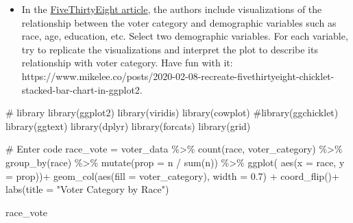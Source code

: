 \documentclass[
  letterpaper,
  DIV=11,
  numbers=noendperiod]{scrartcl}
\newenvironment{Shaded}{\begin{snugshade}}{\end{snugshade}}
\newcommand{\AttributeTok}[1]{\textcolor[rgb]{0.40,0.45,0.13}{#1}}
\newcommand{\CommentTok}[1]{\textcolor[rgb]{0.37,0.37,0.37}{#1}}
\newcommand{\FloatTok}[1]{\textcolor[rgb]{0.68,0.00,0.00}{#1}}
\newcommand{\FunctionTok}[1]{\textcolor[rgb]{0.28,0.35,0.67}{#1}}
\newcommand{\NormalTok}[1]{\textcolor[rgb]{0.00,0.23,0.31}{#1}}
\newcommand{\OtherTok}[1]{\textcolor[rgb]{0.00,0.23,0.31}{#1}}
\newcommand{\SpecialCharTok}[1]{\textcolor[rgb]{0.37,0.37,0.37}{#1}}
\newcommand{\StringTok}[1]{\textcolor[rgb]{0.13,0.47,0.30}{#1}}
\providecommand{\tightlist}{%
  \setlength{\itemsep}{0pt}\setlength{\parskip}{0pt}}\usepackage{longtable,booktabs,array}
\begin{document}
\begin{itemize}
\tightlist
\item
  In the
  \href{https://projects.fivethirtyeight.com/non-voters-poll-2020-election/}{FiveThirtyEight
  article}, the authors include visualizations of the relationship
  between the voter category and demographic variables such as race,
  age, education, etc. Select two demographic variables. For each
  variable, try to replicate the visualizations and interpret the plot
  to describe its relationship with voter category. Have fun with it:
  https://www.mikelee.co/posts/2020-02-08-recreate-fivethirtyeight-chicklet-stacked-bar-chart-in-ggplot2.
\end{itemize}

\begin{Shaded}
\begin{Highlighting}[]
\CommentTok{\# library}
\FunctionTok{library}\NormalTok{(ggplot2)}
\FunctionTok{library}\NormalTok{(viridis)}
\FunctionTok{library}\NormalTok{(cowplot)}
    \CommentTok{\#library(ggchicklet)}
    \FunctionTok{library}\NormalTok{(ggtext)}
    \FunctionTok{library}\NormalTok{(dplyr)}
    \FunctionTok{library}\NormalTok{(forcats)}
    \FunctionTok{library}\NormalTok{(grid)}

\CommentTok{\# Enter code}
\NormalTok{race\_vote }\OtherTok{=}\NormalTok{ voter\_data }\SpecialCharTok{\%\textgreater{}\%}
  \FunctionTok{count}\NormalTok{(race, voter\_category) }\SpecialCharTok{\%\textgreater{}\%}
  \FunctionTok{group\_by}\NormalTok{(race) }\SpecialCharTok{\%\textgreater{}\%}
  \FunctionTok{mutate}\NormalTok{(}\AttributeTok{prop =}\NormalTok{ n }\SpecialCharTok{/} \FunctionTok{sum}\NormalTok{(n)) }\SpecialCharTok{\%\textgreater{}\%}
  \FunctionTok{ggplot}\NormalTok{( }\FunctionTok{aes}\NormalTok{(}\AttributeTok{x =}\NormalTok{ race, }\AttributeTok{y =}\NormalTok{ prop))}\SpecialCharTok{+}
  \FunctionTok{geom\_col}\NormalTok{(}\FunctionTok{aes}\NormalTok{(}\AttributeTok{fill =}\NormalTok{ voter\_category), }\AttributeTok{width =} \FloatTok{0.7}\NormalTok{) }\SpecialCharTok{+} \FunctionTok{coord\_flip}\NormalTok{()}\SpecialCharTok{+}
  \FunctionTok{labs}\NormalTok{(}\AttributeTok{title =} \StringTok{"Voter Category by Race"}\NormalTok{)}

\NormalTok{race\_vote}
\end{Highlighting}
\end{Shaded}
\end{document}
